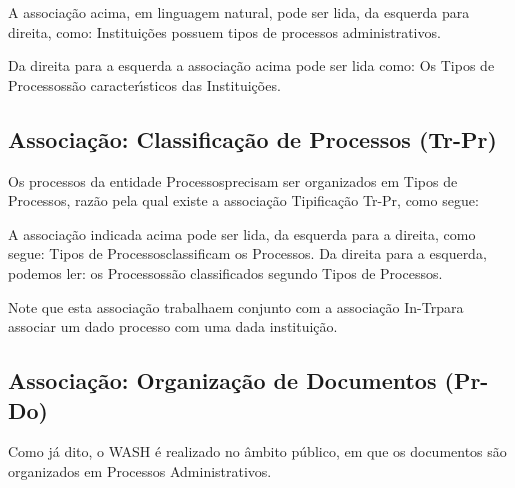 \documentclass[
12pt,		%
openright,	%
twoside,  %
a4paper,			%
chapter=TITLE,		%
english,			%
french,				%
spanish,			%
brazil				%
]{USPSC-classe/USPSC}
\begin{document}
A associa\c{c}\~ao acima, em linguagem natural, pode ser lida, da esquerda para direita, como: Institui\c{c}\~oes possuem tipos de processos administrativos.




Da direita para a esquerda a associa\c{c}\~ao acima pode ser lida como: Os \textquotedbl Tipos de Processos\textquotedbl  s\~ao caracter\'{\i}sticos das \textquotedbl Institui\c{c}\~oes\textquotedbl .




\subsection[Associa\c{c}\~ao: Classifica\c{c}\~ao de Processos (Tr-Pr)]{Associa\c{c}\~ao: Classifica\c{c}\~ao de Processos (Tr-Pr)}\label{Associa\c{c}\~ao: Classifica\c{c}\~ao de Processos (Tr-Pr)}
Os processos da entidade \textquotedbl Processos\textquotedbl  precisam ser organizados em \textquotedbl Tipos de Processos\textquotedbl , raz\~ao pela qual existe a associa\c{c}\~ao \textquotedbl Tipifica\c{c}\~ao Tr-Pr\textquotedbl , como segue:






A associa\c{c}\~ao indicada acima pode ser lida, da esquerda para a direita, como segue: \textquotedbl Tipos de Processos\textquotedbl  classificam os \textquotedbl Processos\textquotedbl . Da direita para a esquerda, podemos ler: os \textquotedbl Processos\textquotedbl  s\~ao classificados segundo \textquotedbl Tipos de Processos\textquotedbl .




Note que esta associa\c{c}\~ao \textquotedbl trabalha\textquotedbl  em conjunto com a associa\c{c}\~ao \textquotedbl In-Tr\textquotedbl  para associar um dado processo com uma dada institui\c{c}\~ao.




\subsection[Associa\c{c}\~ao: Organiza\c{c}\~ao de Documentos (Pr-Do)]{Associa\c{c}\~ao: Organiza\c{c}\~ao de Documentos (Pr-Do)}\label{Associa\c{c}\~ao: Organiza\c{c}\~ao de Documentos (Pr-Do)}
Como j\'a dito, o WASH \'e realizado no \^ambito p\'ublico, em que os documentos s\~ao organizados em Processos Administrativos.
\end{document}
